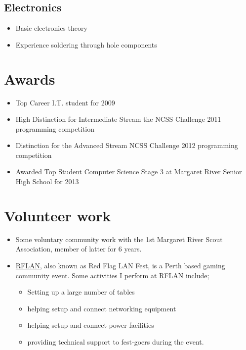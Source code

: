\documentclass{article}
\begin{document}
  \subsection{Electronics}
    \begin{itemize}
      \item{Basic electronics theory}
      \item{Experience soldering through hole components}
    \end{itemize}

\section{Awards}
  \begin{itemize}
    \item{Top Career I.T. student for 2009}
    \item{High Distinction for Intermediate Stream the NCSS Challenge 2011 programming competition}
    \item{Distinction for the Advanced Stream NCSS Challenge 2012 programming competition}
    \item{Awarded Top Student Computer Science Stage 3 at Margaret River Senior High School for 2013}
  \end{itemize}

\section{Volunteer work}
  \begin{itemize}
    \item{Some voluntary community work with the 1st Margaret River Scout Association, member of latter for 6 years.}
    \item{
        \href{http://www.rflan.org/contact/volunteer.html}{RFLAN}, also known as Red Flag LAN Fest, is a Perth based gaming community event.
        Some activities I perform at RFLAN include;
        \begin{itemize}
          \item{Setting up a large number of tables}
          \item{helping setup and connect networking equipment}
          \item{helping setup and connect power facilities}
          \item{providing technical support to fest-goers during the event.}
        \end{itemize}
    }
  \end{itemize}
\end{document}
